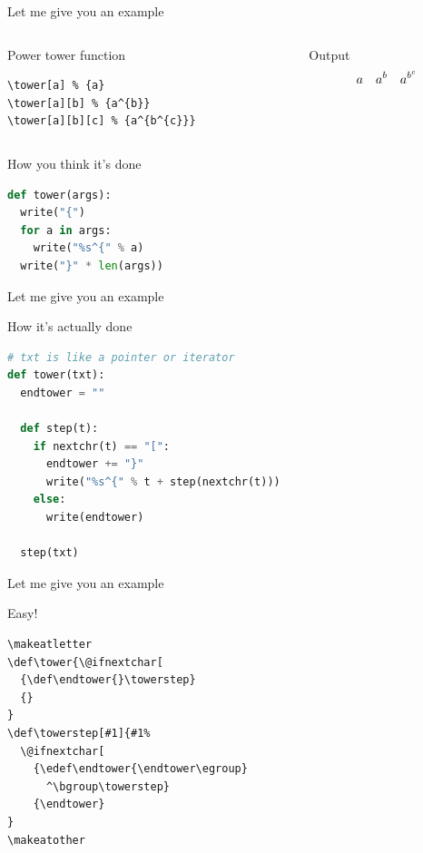 \documentclass[xetex, onlymath, handout]{beamer}
\begin{document}
\begin{frame}[fragile]{Let me give you an example}
  \begin{columns}
    \begin{column}{.6\linewidth}
      \begin{block}{Power tower function}
        \begin{lstlisting}
\tower[a] % {a}
\tower[a][b] % {a^{b}}
\tower[a][b][c] % {a^{b^{c}}}
        \end{lstlisting}
      \end{block}
    \end{column}
    \begin{column}{.4\linewidth}
      \begin{exampleblock}{Output}
        \Large
        \[
          \tower[a] \quad
          \tower[a][b] \quad
          \tower[a][b][c]
        \]
      \end{exampleblock}
    \end{column}
  \end{columns}
  \begin{block}{How you think it's done}
    \begin{lstlisting}[language=python]
def tower(args):
  write("{")
  for a in args:
    write("%s^{" % a)
  write("}" * len(args))
    \end{lstlisting}
  \end{block}
\end{frame}

\begin{frame}[fragile]{Let me give you an example}
  \begin{block}{How it's actually done}
    \begin{lstlisting}[language=python]
# txt is like a pointer or iterator
def tower(txt):
  endtower = ""

  def step(t):
    if nextchr(t) == "[":
      endtower += "}"
      write("%s^{" % t + step(nextchr(t)))
    else:
      write(endtower)

  step(txt)
    \end{lstlisting}
  \end{block}
\end{frame}

\begin{frame}[fragile]{Let me give you an example}
  \begin{block}{Easy!}
    \begin{lstlisting}
\makeatletter
\def\tower{\@ifnextchar[
  {\def\endtower{}\towerstep}
  {}
}
\def\towerstep[#1]{#1%
  \@ifnextchar[
    {\edef\endtower{\endtower\egroup}
      ^\bgroup\towerstep}
    {\endtower}
}
\makeatother
    \end{lstlisting}
  \end{block}
\end{frame}
\end{document}
